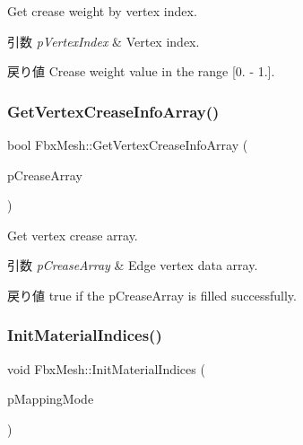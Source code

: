 Get crease weight by vertex index. 
\begin{DoxyParams}{引数}
{\em p\+Vertex\+Index} & Vertex index. \\
\hline
\end{DoxyParams}
\begin{DoxyReturn}{戻り値}
Crease weight value in the range \mbox{[}0. -\/ 1.\mbox{]}. 
\end{DoxyReturn}
\mbox{\label{class_fbx_mesh_a4c62415bddc677a16c9794189b23eeba}} 
\subsubsection{\texorpdfstring{Get\+Vertex\+Crease\+Info\+Array()}{GetVertexCreaseInfoArray()}}
{\footnotesize\ttfamily bool Fbx\+Mesh\+::\+Get\+Vertex\+Crease\+Info\+Array (\begin{DoxyParamCaption}\item[{\hyperlink{class_fbx_layer_element_array_template}{Fbx\+Layer\+Element\+Array\+Template}$<$ double $>$ $\ast$$\ast$}]{p\+Crease\+Array }\end{DoxyParamCaption})}

Get vertex crease array. 
\begin{DoxyParams}{引数}
{\em p\+Crease\+Array} & Edge vertex data array. \\
\hline
\end{DoxyParams}
\begin{DoxyReturn}{戻り値}
{\ttfamily true} if the p\+Crease\+Array is filled successfully. 
\end{DoxyReturn}
\mbox{\label{class_fbx_mesh_afb22daa8a980e8946abed7cbf39ce4f0}} 
\subsubsection{\texorpdfstring{Init\+Material\+Indices()}{InitMaterialIndices()}}
{\footnotesize\ttfamily void Fbx\+Mesh\+::\+Init\+Material\+Indices (\begin{DoxyParamCaption}\item[{\hyperlink{class_fbx_layer_element_a5a40e95db30ae9f94611dc3f1568af26}{Fbx\+Layer\+Element\+::\+E\+Mapping\+Mode}}]{p\+Mapping\+Mode }\end{DoxyParamCaption})}

